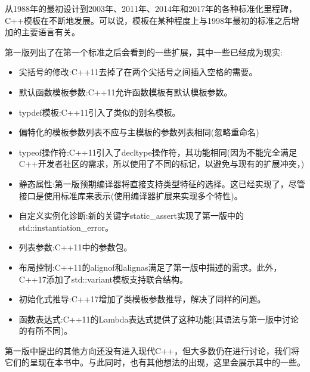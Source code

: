 
从1988年的最初设计到2003年、2011年、2014年和2017年的各种标准化里程碑，C++模板在不断地发展。可以说，模板在某种程度上与1998年最初的标准之后增加的主要语言有关。

第一版列出了在第一个标准之后会看到的一些扩展，其中一些已经成为现实:


\begin{itemize}
\item 
尖括号的修改:C++11去掉了在两个尖括号之间插入空格的需要。

\item 
默认函数模板参数:C++11允许函数模板有默认模板参数。

\item 
typdef模板:C++11引入了类似的别名模板。

\item 
偏特化的模板参数列表不应与主模板的参数列表相同(忽略重命名)

\item 
typeof操作符:C++11引入了decltype操作符，其功能相同(因为不能完全满足C++开发者社区的需求，所以使用了不同的标记，以避免与现有的扩展冲突，)

\item 
静态属性:第一版预期编译器将直接支持类型特征的选择。这已经实现了，尽管接口是使用标准库来表示(使用编译器扩展来实现多个特性)。

\item 
自定义实例化诊断:新的关键字static\_assert实现了第一版中的std::instantiation\_error。

\item 
列表参数:C++11中的参数包。

\item 
布局控制:C++11的alignof和alignas满足了第一版中描述的需求。此外，C++17添加了std::variant模板支持联合结构。

\item 
初始化式推导:C++17增加了类模板参数推导，解决了同样的问题。

\item 
函数表达式:C++11的Lambda表达式提供了这种功能(其语法与第一版中讨论的有所不同)。
\end{itemize}

第一版中提出的其他方向还没有进入现代C++，但大多数仍在进行讨论，我们将它们的呈现在本书中。与此同时，也有其他想法的出现，这里会展示其中的一些。



